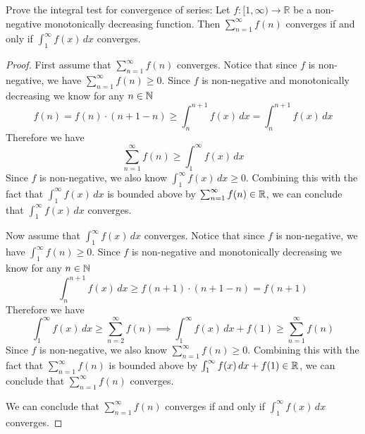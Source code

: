 \documentclass{exam}
\begin{document}
\begin{mybox}

  Prove the integral test for convergence of series: Let 
  $f : [1, \infty) \rightarrow \mathbb{R}$ be a non-negative
  monotonically decreasing function. Then $\sum_{n=1}^{\infty} f(n)$
  converges if and only if $\int_{1}^{\infty} f(x) \, dx$ converges.

\end{mybox}

\begin{proof}
  First assume that $\sum_{n=1}^{\infty} f(n)$ converges. Notice that
  since $f$ is non-negative, we have $\sum_{n=1}^{\infty} f(n) \geq 0$.
  Since $f$ is non-negative and monotonically decreasing we know for 
  any $n\in\mathbb{N}$  $$f(n) = f(n)\cdot (n+1 - n) \geq \int_n^{n+1}f(x) \, 
  dx = \int_n^{n+1}f(x) \, dx$$ Therefore we have 
  $$\sum_{n=1}^{\infty} f(n)  \geq   \int_{1}^{\infty} f(x) \, dx$$
  Since $f$ is non-negative, we also know $\int_{1}^{\infty} f(x) 
  \, dx \geq 0$. Combining this with the fact that $\int_{1}^{\infty} 
  f(x) \, dx$ is bounded above by $\sum_{n=1}^{\infty} f(n) \in\mathbb{R}$,
  we can conclude that $\int_{1}^{\infty} f(x) \, dx$ converges.

  Now assume that $\int_{1}^{\infty} f(x) \, dx$ converges. Notice that 
  since $f$ is non-negative, we have $\int_1^{\infty} f(n) \geq 0$. 
  Since $f$ is non-negative and monotonically decreasing we know for 
  any $n\in\mathbb{N}$ $$\int_n^{n+1}f(x) \, dx \geq f(n+1)\cdot (n+1-n)= 
  f(n+1)$$ Therefore we have $$\int_{1}^{\infty} f(x) \, dx \geq 
  \sum_{n=2}^{\infty}f(n) \implies \int_{1}^{\infty} f(x) \, dx 
  + f(1) \geq \sum_{n=1}^{\infty}f(n)$$ Since $f$ is non-negative, 
  we also know $\sum_{n=1}^{\infty}f(n) \geq 0$. Combining this with 
  the fact that $\sum_{n=1}^{\infty}f(n)$ is bounded above by 
  $\int_{1}^{\infty} f(x) \, dx + f(1)\in\mathbb{R}$, we can conclude that 
  $\sum_{n=1}^{\infty}f(n)$ converges.

  We can conclude that $\sum_{n=1}^{\infty} f(n)$ converges if and 
  only if $\int_{1}^{\infty} f(x) \, dx$ converges.
\end{proof}

\begin{rating}
\end{rating}
\end{document}
